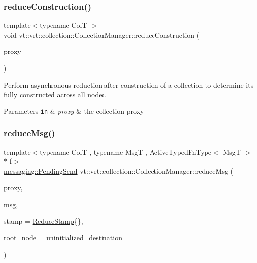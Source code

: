 \subsubsection{\texorpdfstring{reduce\+Construction()}{reduceConstruction()}}
{\footnotesize\ttfamily template$<$typename ColT $>$ \\
void vt\+::vrt\+::collection\+::\+Collection\+Manager\+::reduce\+Construction (\begin{DoxyParamCaption}\item[{\hyperlink{namespacevt_a1b417dd5d684f045bb58a0ede70045ac}{Virtual\+Proxy\+Type} const \&}]{proxy }\end{DoxyParamCaption})\hspace{0.3cm}{\ttfamily [static]}}



Perform asynchronous reduction after construction of a collection to determine it\textquotesingle{}s fully constructed across all nodes. 


\begin{DoxyParams}[1]{Parameters}
\mbox{\tt in}  & {\em proxy} & the collection proxy \\
\hline
\end{DoxyParams}
\mbox{\label{structvt_1_1vrt_1_1collection_1_1_collection_manager_a2ac056928e39edf125420e1113cde2bf}} 
\subsubsection{\texorpdfstring{reduce\+Msg()}{reduceMsg()}\hspace{0.1cm}{\footnotesize\ttfamily [1/2]}}
{\footnotesize\ttfamily template$<$typename ColT , typename MsgT , Active\+Typed\+Fn\+Type$<$ Msg\+T $>$ $\ast$ f$>$ \\
\hyperlink{structvt_1_1messaging_1_1_pending_send}{messaging\+::\+Pending\+Send} vt\+::vrt\+::collection\+::\+Collection\+Manager\+::reduce\+Msg (\begin{DoxyParamCaption}\item[{\hyperlink{structvt_1_1vrt_1_1collection_1_1_collection_manager_a56458ed7f9bb22b631b9b3a745f42f94}{Collection\+Proxy\+Wrap\+Type}$<$ ColT $>$ const \&}]{proxy,  }\item[{MsgT $\ast$const}]{msg,  }\item[{\hyperlink{structvt_1_1vrt_1_1collection_1_1_collection_manager_ae8aac19e0ae07e9225142e5880eac830}{Reduce\+Stamp}}]{stamp = {\ttfamily \hyperlink{structvt_1_1vrt_1_1collection_1_1_collection_manager_ae8aac19e0ae07e9225142e5880eac830}{Reduce\+Stamp}\{\}},  }\item[{\hyperlink{namespacevt_a866da9d0efc19c0a1ce79e9e492f47e2}{Node\+Type}}]{root\+\_\+node = {\ttfamily uninitialized\+\_\+destination} }\end{DoxyParamCaption})}



